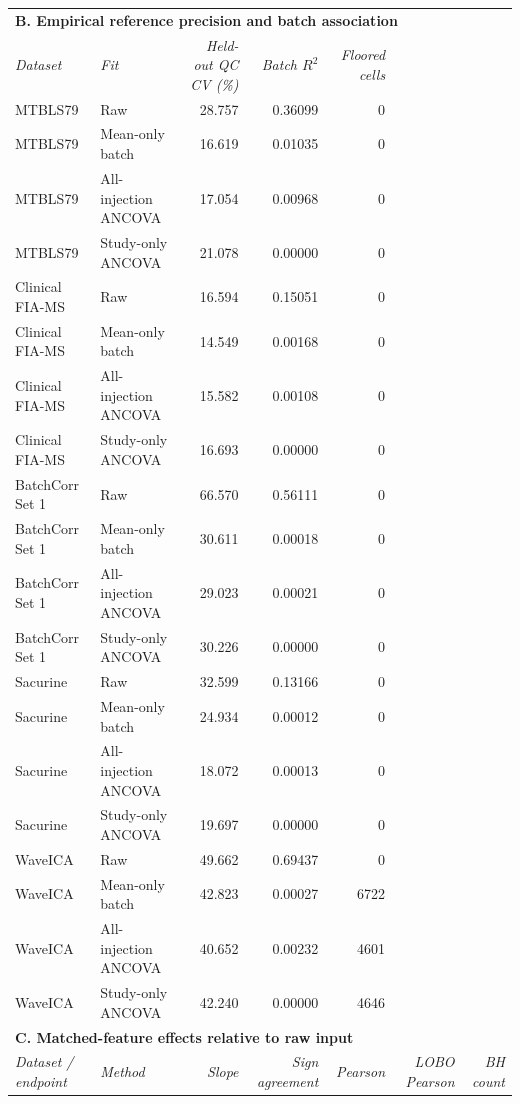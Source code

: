 \begin{landscape}
\begin{longtable}{p{3.0cm}p{3.6cm}rrrrr}
\midrule
\multicolumn{7}{l}{\textbf{B. Empirical reference precision and batch association}} \\
\textit{Dataset} & \textit{Fit} & \textit{Held-out QC CV (\%)} & \textit{Batch $R^2$} & \textit{Floored cells} &  &  \\
\midrule
MTBLS79 & Raw & 28.757 & 0.36099 & 0 &  &  \\
MTBLS79 & Mean-only batch & 16.619 & 0.01035 & 0 &  &  \\
MTBLS79 & All-injection ANCOVA & 17.054 & 0.00968 & 0 &  &  \\
MTBLS79 & Study-only ANCOVA & 21.078 & 0.00000 & 0 &  &  \\
Clinical FIA-MS & Raw & 16.594 & 0.15051 & 0 &  &  \\
Clinical FIA-MS & Mean-only batch & 14.549 & 0.00168 & 0 &  &  \\
Clinical FIA-MS & All-injection ANCOVA & 15.582 & 0.00108 & 0 &  &  \\
Clinical FIA-MS & Study-only ANCOVA & 16.693 & 0.00000 & 0 &  &  \\
BatchCorr Set 1 & Raw & 66.570 & 0.56111 & 0 &  &  \\
BatchCorr Set 1 & Mean-only batch & 30.611 & 0.00018 & 0 &  &  \\
BatchCorr Set 1 & All-injection ANCOVA & 29.023 & 0.00021 & 0 &  &  \\
BatchCorr Set 1 & Study-only ANCOVA & 30.226 & 0.00000 & 0 &  &  \\
Sacurine & Raw & 32.599 & 0.13166 & 0 &  &  \\
Sacurine & Mean-only batch & 24.934 & 0.00012 & 0 &  &  \\
Sacurine & All-injection ANCOVA & 18.072 & 0.00013 & 0 &  &  \\
Sacurine & Study-only ANCOVA & 19.697 & 0.00000 & 0 &  &  \\
WaveICA & Raw & 49.662 & 0.69437 & 0 &  &  \\
WaveICA & Mean-only batch & 42.823 & 0.00027 & 6722 &  &  \\
WaveICA & All-injection ANCOVA & 40.652 & 0.00232 & 4601 &  &  \\
WaveICA & Study-only ANCOVA & 42.240 & 0.00000 & 4646 &  &  \\
\midrule
\multicolumn{7}{l}{\textbf{C. Matched-feature effects relative to raw input}} \\
\textit{Dataset / endpoint} & \textit{Method} & \textit{Slope} & \textit{Sign agreement} & \textit{Pearson} & \textit{LOBO Pearson} & \textit{BH count} \\

\end{longtable}
\end{landscape}
